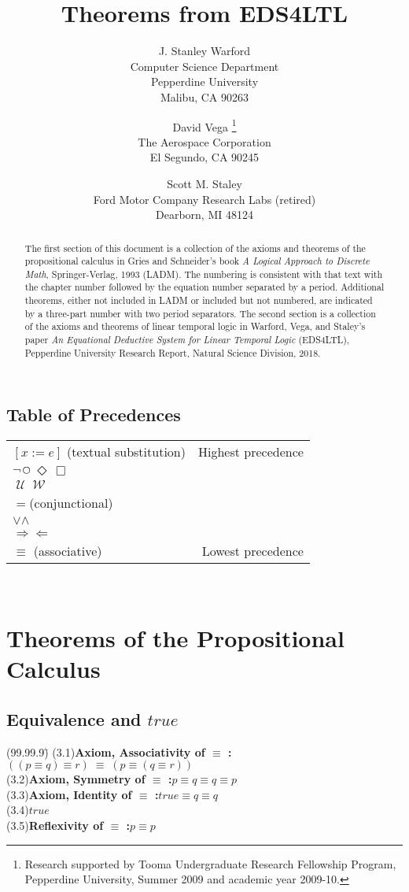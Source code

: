 \documentclass[12pt, fleqn, leqno]{article}
\title{Theorems from EDS4LTL}
\author{
   J. Stanley Warford\\
   Computer Science Department\\
   Pepperdine University\\
   Malibu, CA 90263
   \and
   David Vega
   \thanks{Research supported by Tooma Undergraduate Research Fellowship Program,
   Pepperdine University,
   Summer 2009 and academic year 2009-10.}\\
   The Aerospace Corporation\\
   El Segundo, CA 90245
   \and
   Scott M. Staley\\
   Ford Motor Company Research Labs (retired)\\
   Dearborn, MI 48124}
\date{} %
\newcommand{\lgap}{2pt}                             %
\newcommand{\llgap}{6pt}                            %
\newcommand{\equivs}{\ensuremath{\;\equiv\;}}       %
\newcommand{\impl}{\ensuremath{\Rightarrow}}        %
\newcommand{\foll}{\ensuremath{\Leftarrow}}         %
\newcommand{\Until}{\;\mathcal{U}\;}
\newcommand{\Wait}{\;\mathcal{W}\;}
\newcommand{\Next}{\;\,\text{\raisebox{3.5pt}{\circle{6}}}}
\newcommand{\Event}{\Diamond\,}
\newcommand{\Always}{\Box\,}
\begin{document}
\maketitle

\begin{abstract}
The first section of this document is a collection of the axioms and theorems of the
propositional calculus in Gries and Schneider's
book \textit{A Logical Approach to Discrete Math}, Springer-Verlag, 1993 (LADM).
The numbering is consistent with that text with the chapter number followed by the equation number separated by a period.
Additional theorems, either not included in LADM or included but not numbered, are indicated by a three-part number with two period separators.
The second section is a collection of the axioms and theorems of linear temporal logic
in Warford, Vega, and Staley's paper \textit{An Equational Deductive System for Linear Temporal Logic}
(EDS4LTL),
Pepperdine University Research Report, Natural Science Division, 2018.
\end{abstract}

\subsection*{Table of Precedences}

\begin{tabular}{lr}
\hline
$[x := e]$ (textual substitution) & Highest precedence\\
$\neg$\quad $\Next$\quad $\Event$\quad $\Always$ &\\
$\Until$\quad $\Wait$ &\\
$=$\quad (conjunctional) &\\
$\lor$\quad $\land$ &\\
$\impl$\quad $\foll$ &\\
$\equiv$ \quad (associative) & Lowest precedence\\
\hline
\end{tabular}\\[\llgap]

\section*{Theorems of the Propositional Calculus}

\subsection*{Equivalence and $true$}
\begin{tabbing}
(99.99.9)\;\=\kill
(3.1)\>\textbf{Axiom, Associativity of $\equiv$ :}\quad $((p\equiv q) \equiv r)\equivs (p\equiv (q\equiv r))$\\[\lgap]
(3.2)\>\textbf{Axiom, Symmetry of $\equiv$ :}\quad $p\equiv q \equiv q\equiv p$\\[\lgap]
(3.3)\>\textbf{Axiom, Identity of $\equiv$ :}\quad $true\equiv q \equiv q$\\[\lgap]
(3.4)\>$true$\\[\lgap]
(3.5)\>\textbf{Reflexivity of $\equiv$ :}\quad $p\equiv p$\\
\end{tabbing}
\end{document}
